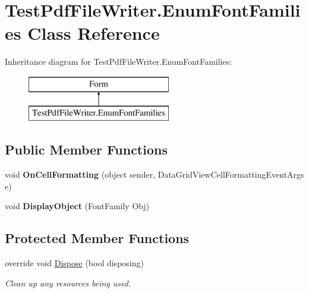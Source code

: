 \hypertarget{class_test_pdf_file_writer_1_1_enum_font_families}{}\section{Test\+Pdf\+File\+Writer.\+Enum\+Font\+Families Class Reference}
\label{class_test_pdf_file_writer_1_1_enum_font_families}
Inheritance diagram for Test\+Pdf\+File\+Writer.\+Enum\+Font\+Families\+:\begin{figure}[H]
\begin{center}
\leavevmode
\includegraphics[height=2.000000cm]{class_test_pdf_file_writer_1_1_enum_font_families}
\end{center}
\end{figure}
\subsection*{Public Member Functions}
\begin{DoxyCompactItemize}
\item 
void {\bfseries On\+Cell\+Formatting} (object sender, Data\+Grid\+View\+Cell\+Formatting\+Event\+Args e)\hypertarget{class_test_pdf_file_writer_1_1_enum_font_families_a9d6bd6cc4c8d83e0b7f526e0dbd9f732}{}\label{class_test_pdf_file_writer_1_1_enum_font_families_a9d6bd6cc4c8d83e0b7f526e0dbd9f732}

\item 
void {\bfseries Display\+Object} (Font\+Family Obj)\hypertarget{class_test_pdf_file_writer_1_1_enum_font_families_a94de4c01fd892fc7557ec9bc6394634e}{}\label{class_test_pdf_file_writer_1_1_enum_font_families_a94de4c01fd892fc7557ec9bc6394634e}

\end{DoxyCompactItemize}
\subsection*{Protected Member Functions}
\begin{DoxyCompactItemize}
\item 
override void \hyperlink{class_test_pdf_file_writer_1_1_enum_font_families_a9fbaf0cd28c7d577445310e1b1d09a50}{Dispose} (bool disposing)
\begin{DoxyCompactList}\small\item\em Clean up any resources being used. \end{DoxyCompactList}\end{DoxyCompactItemize}


